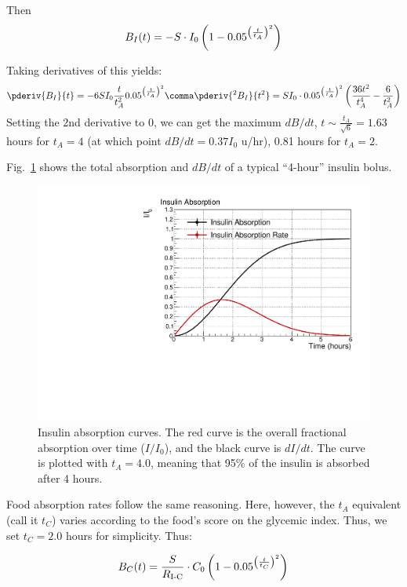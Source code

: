 Then
\begin{equation}
{B_I}(t) = -S\cdot I_0\left( 1 - 0.05^{\left({t\over{t_A}}\right)^2} \right)
\label{eq:insulin}
\end{equation}

Taking derivatives of this yields:
\begin{equation}
\pderiv{B_I}{t} = -6SI_0\frac t{t_A^2} 0.05^{\left(\frac t{t_A}\right)^2}
\comma
\pderiv{^2 B_I}{t^2} = SI_0\cdot0.05^{\left(\frac t{t_A}\right)^2}\left({36t^2\over t_A^4} - {6\over t_A^2} \right)
\end{equation}
Setting the 2nd derivative to 0, we can get the maximum $dB/dt$, $t\sim \frac {t_A}{\sqrt{6}}=1.63$ 
hours for $t_A=4$ (at which point $dB/dt=0.37I_0$ u/hr), 0.81 hours for $t_A=2$. 

Fig.~\ref{fig:absorption} shows the total absorption and $dB/dt$ of a typical ``4-hour'' insulin bolus.

\begin{figure}[htbp]
\begin{center}
\includegraphics[width=4.5in]{figures/absorption.pdf}
\caption{Insulin absorption curves. The red curve is the overall fractional absorption over time 
($I/I_0$), and the black curve is $dI/dt$. The curve is plotted with $t_A=4.0$, meaning that 95\% of 
the insulin is absorbed after 4 hours.}
\label{fig:absorption}
\end{center}
\end{figure}

Food absorption rates follow the same reasoning. Here, however, the $t_A$  equivalent (call it $t_C$) 
varies according to the food's score on the glycemic index. Thus, we set $t_C=2.0$ hours for 
simplicity. Thus:

\begin{equation}
{B_C}(t) = {S\over R_\text{I-C}}\cdot C_0\left( 1 - 0.05^{\left({t\over{t_C}}\right)^2} \right)
\label{eq:carb}
\end{equation}

